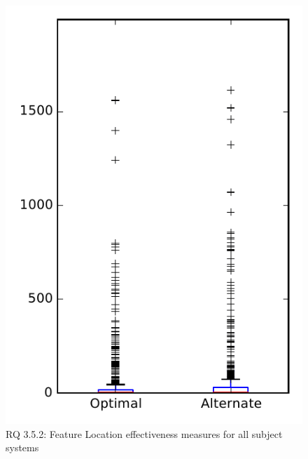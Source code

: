 
\begin{figure}
\centering
\includegraphics[height=0.4\textheight]{figures/combo/flt_rq2_overview}
\caption{RQ 3.5.2: Feature Location effectiveness measures for all subject systems}
\label{fig:flt:rq2:overview}
\end{figure}
